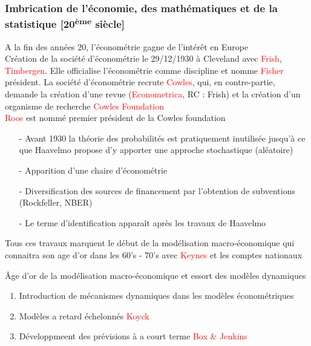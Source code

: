 \documentclass{article}
\begin{document}
\subsubsection{Imbrication de l'économie, des mathématiques et de la statistique [20\textsuperscript{ème} siècle]}
A la fin des années 20, l'économétrie gagne de l'intérêt en Europe\\
Création de la société d'économétrie le 29/12/1930 à Cleveland avec \textcolor{red}{Frish},       \textcolor{red}{Timbergen}. Elle officialise l'économétrie comme discipline et nomme \textcolor{red}{Fisher} président. La société d'économétrie recrute \textcolor{red}{Cowles}, qui, en contre-partie, demande la création d'une revue (\textcolor{red}{Econometrica}, RC : Frish) et la création d'un organisme de recherche \textcolor{red}{Cowles Foundation}\\ \textcolor{red}{Roos} est nommé premier président de la Cowles foundation\\

\begin{itemize}
    \item[-] Avant 1930 la théorie des probabilités est pratiquement inutilisée jusqu'à ce que Haavelmo propose d'y apporter une approche stochastique (aléatoire)
    \item[-] Apparition d'une chaire d'économétrie
    \item[-] Diversification des sources de financement par l'obtention de subventions (Rockfeller, NBER)
    \item[-] Le terme d'identification apparaît après les travaux de Haavelmo
\end{itemize}

Tous ces travaux marquent le début de la modélisation macro-économique qui connaitra son age d'or dans les 60's - 70's avec \textcolor{red}{Keynes} et les comptes nationaux

Âge d'or de la modélisation macro-économique et essort des modèles dynamiques
\begin{enumerate}
    \item Introduction de mécanismes dynamiques dans les modèles économétriques
    \item Modèles a retard échelonnés \textcolor{red}{Koyck}
    \item Développmeent des prévisions à a court terme \textcolor{red}{Box \& Jenkins}
\end{enumerate}
\end{document}
